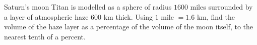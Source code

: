 Saturn's moon Titan is modelled as a sphere of radius \(1600\) miles surrounded by a layer of atmospheric haze \(600\) km thick. Using \(1\) mile \(=1.6\) km, find the volume of the haze layer as a percentage of the volume of the moon itself, to the nearest tenth of a percent.
